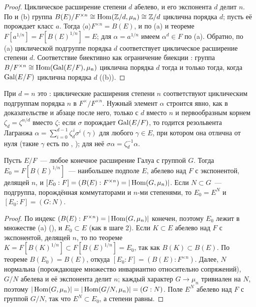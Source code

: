 \begin{proof}
Циклическое расширение степени $d$ абелево, и его экспонента $d$ делит $n$. По  и (b) группа
$B(E)/F^{\times n}\cong\operatorname{Hom}(\mathbb Z/d,\mu_n)\cong\mathbb Z/d$ циклична порядка $d$; пусть её порождает класс $a$. Тогда $\langle a\rangle F^{\times n}=B(E)$, и по (a) и
теореме  $F[a^{1/n}]=F[B(E)^{1/n}]=E$; для $\alpha=a^{1/n}$ имеем $\alpha^d\in F$ по (a). Обратно, по (a)
циклической подгруппе порядка $d$ соответствует циклическое расширение степени $d$. Соответствие биективно как ограничение
биекции : группа $B/F^{\times n}\cong\operatorname{Hom}(\operatorname{Gal}(E/F),\mu_n)$ циклична порядка $d$ тогда и только тогда, когда
$\operatorname{Gal}(E/F)$ циклична порядка $d$ ((b)).
\end{proof}

При $d=n$ это : циклические расширения степени $n$ соответствуют циклическим подгруппам порядка $n$ в
$F^\times/F^{\times n}$. Нужный элемент $\alpha$ строится явно, как в доказательстве  и абзаце после него, только с $d$
вместо $n$ и первообразным корнем $\zeta_d=\zeta^{n/d}$ вместо $\zeta$: если $\sigma$ порождает $\operatorname{Gal}(E/F)$, то годится
резольвента Лагранжа $\alpha=\sum_{i=0}^{d-1}\zeta_d^{\,i}\sigma^i(\gamma)$ для любого $\gamma\in E$, при котором она
отлична от нуля (такие $\gamma$ есть по , ); для неё $\sigma\alpha=\zeta_d^{-1}\alpha$.

\begin{corollary}
Пусть $E/F$~--- любое конечное расширение Галуа с группой $G$. Тогда $E_0=F[B(E)^{1/n}]$~--- наибольшее подполе $E$,
абелево над $F$ с экспонентой, делящей $n$, и $[E_0:F]=(B(E):F^{\times n})=|\operatorname{Hom}(G,\mu_n)|$. Если $N\subset G$~---
подгруппа, порождённая коммутаторами и $n$-ми степенями, то $E_0=E^N$ и $[E_0:F]=(G:N)$.
\end{corollary}

\begin{proof}
По  индекс $(B(E):F^{\times n})=|\operatorname{Hom}(G,\mu_n)|$ конечен, поэтому $E_0$ лежит в множестве (a) (), и
$E_0\subset E$ (как в шаге 2). Если $K\subset E$ абелево над $F$ с экспонентой, делящей $n$, то по теореме 
$K=F[B(K)^{1/n}]\subset F[B(E)^{1/n}]=E_0$, так как $B(K)\subset B(E)$. По теореме $B(E_0)=B(E)$, откуда
$[E_0:F]=(B(E):F^{\times n})$. Далее, $N$ нормальна (порождающее множество инвариантно относительно сопряжений), $G/N$
абелева и её экспонента делит $n$; каждый характер $G\to\mu_n$ тривиален на $N$, поэтому $|\operatorname{Hom}(G,\mu_n)|=
|\operatorname{Hom}(G/N,\mu_n)|=(G:N)$. Поле $E^N$ абелево над $F$ с группой $G/N$, так что $E^N\subset E_0$, а степени равны.
\end{proof}

